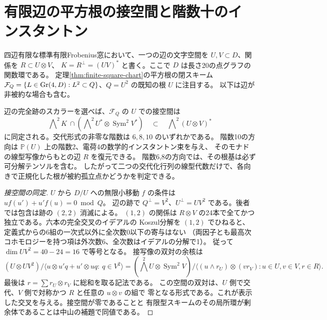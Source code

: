 \section{有限辺の平方根の接空間と階数十のインスタントン}
\label{sec:finite-square-tangent-instantons}
四辺有限な標準有限Frobenius窓において、一つの辺の文字空間を $U,V\subset D$、関係を $R\subset U\otimes V$、
$K=R^\perp=(UV)^*$ と書く。ここで $D$ は長さ20の点グラフの関数環である。
定理\ref{thm:finite-square-chart}の平方根の閉スキーム
$\mathcal F_Q=\{L\in\operatorname{Gr}(4,D):L^2\subset Q\}$、$Q=U^2$ の既知の根 $U$ に注目する。
以下は辺が非被約な場合も含む。
\begin{theorem}\label{thm:finite-square-tangent-instantons}
辺の完全跡のスカラーを選べば、$\mathcal F_Q$ の $U$ での接空間は
\[
 \bigwedge\nolimits^2 K\ \cap  \left(\bigwedge\nolimits^2 U^*\otimes\operatorname{Sym}^2 V^*\right)
 \quad\subset\quad \bigwedge\nolimits^2(U\otimes V)^*
\]
に同定される。交代形式の非零な階数は $6,8,10$ のいずれかである。
階数10の方向は $\mathbb P(U)$ 上の階数2、電荷4の数学的インスタントン束を与え、
そのモナドの線型写像からもとの辺 $R$ を復元できる。
階数6,8の方向では、その根基は必ず可分解テンソルを含む。
したがって二つの交代化行列の線型代数だけで、各向きで正規化した根が被約孤立点かどうかを判定できる。
\end{theorem}
\begin{proof}[接空間の同定]
$U$ から $D/U$ への無限小移動 $f$ の条件は $u f(u')+u'f(u)=0\bmod Q$。
辺の跡で $Q^\perp=V^2$、$U^\perp=UV^2$ である。後者では包含は跡の $(2,2)$ 消滅による。
$(1,2)$ の関係は $R\otimes V$ の24本で全てかつ独立である。六本の完全交叉のイデアルの
Koszul分解を $(1,2)$ でひねると、定義式からの6組の一次式以外に全次数0以下の寄与はない
（両因子とも最高次コホモロジーを持つ項は外次数6、全次数はイデアルの分解で1）。
従って $\dim UV^2=40-24=16$ で等号となる。
接写像の双対の余核は
\[
 (U\otimes UV^2)/\langle u\otimes u'q+u'\otimes uq:\ q\in V^2\rangle
   = (\bigwedge^2 U\otimes\operatorname{Sym}^2 V)/
      \langle(u\wedge r_U)\otimes (v r_V):u\in U,v\in V,r\in R\rangle .
\]
最後は $r=\sum r_U\otimes r_V$ に総和を取る記法である。
この空間の双対は、$U$ 側で交代、$V$ 側で対称かつ $R$ と任意の $u\otimes v$ の組で
零となる形式である。これが表示した交叉を与える。接空間が零であることと
有限型スキームのその局所環が剰余体であることは中山の補題で同値である。
\end{proof}

